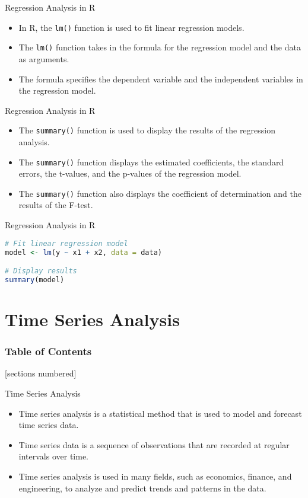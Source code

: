 \documentclass[serif, 9pt, aspectratio=32]{beamer}
\begin{document}
\begin{frame}{Regression Analysis in R}
    \begin{itemize}
        \setlength{\itemsep}{2em}
        \item In R, the \texttt{lm()} function is used to fit linear regression models.
        \item The \texttt{lm()} function takes in the formula for the regression model and the data as arguments.
        \item The formula specifies the dependent variable and the independent variables in the regression model.
    \end{itemize}
\end{frame}

\begin{frame}{Regression Analysis in R}
    \begin{itemize}
        \setlength{\itemsep}{2em}
        \item The \texttt{summary()} function is used to display the results of the regression analysis.
        \item The \texttt{summary()} function displays the estimated coefficients, the standard errors, the t-values, and the p-values of the regression model.
        \item The \texttt{summary()} function also displays the coefficient of determination and the results of the F-test.
    \end{itemize}
\end{frame}

\begin{frame}[fragile]{Regression Analysis in R}
    \begin{lstlisting}[language=R]
# Fit linear regression model
model <- lm(y ~ x1 + x2, data = data)

# Display results
summary(model)
    \end{lstlisting}
\end{frame}

\section{Time Series Analysis}

\begin{frame}
    \frametitle{Table of Contents}
    [sections numbered]
    \tableofcontents[currentsection]
\end{frame}

\begin{frame}{Time Series Analysis}
    \begin{itemize}
        \item Time series analysis is a statistical method that is used to model and forecast time series data.
        \item Time series data is a sequence of observations that are recorded at regular intervals over time.
        \item Time series analysis is used in many fields, such as economics, finance, and engineering, to analyze and predict trends and patterns in the data.
    \end{itemize}
\end{frame}
\end{document}

